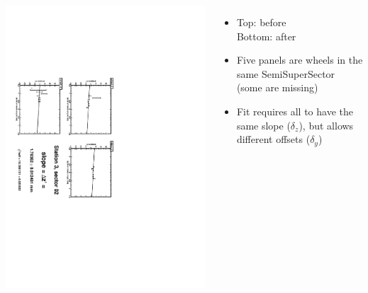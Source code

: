 \documentclass[compress]{beamer}
\begin{document}
\begin{frame}
\begin{columns}
\vfill
\includegraphics[height=\linewidth, angle=90]{zfits_after/zfit_3_02.pdf}
\begin{itemize}
\item Top: before \\ Bottom: after
\item Five panels are wheels in the same SemiSuperSector (some are missing)
\item Fit requires all to have the same slope ($\delta_z$), but allows different offsets ($\delta_y$)
\end{itemize}
\end{columns}
\end{frame}
\end{document}
